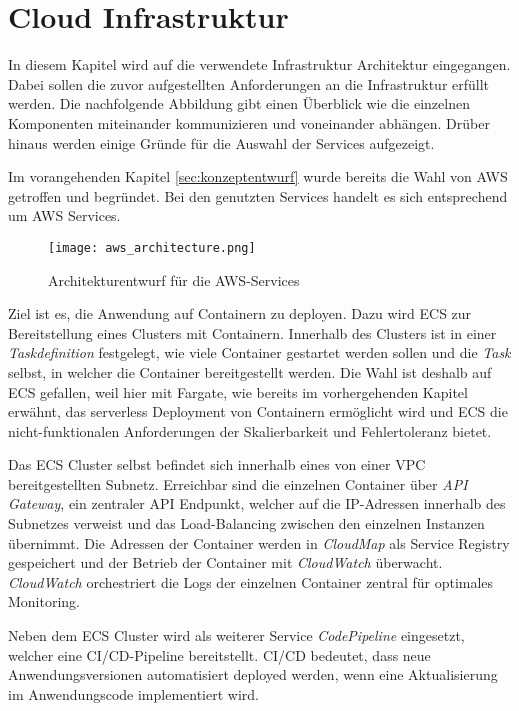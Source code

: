 \section{Cloud Infrastruktur}
In diesem Kapitel wird auf die verwendete Infrastruktur Architektur eingegangen. Dabei sollen die zuvor aufgestellten Anforderungen an die Infrastruktur erfüllt werden. Die nachfolgende Abbildung gibt einen Überblick wie die einzelnen Komponenten miteinander kommunizieren und voneinander abhängen. Drüber hinaus werden einige Gründe für die Auswahl der Services aufgezeigt.

Im vorangehenden Kapitel \ref{sec:konzeptentwurf} wurde bereits die Wahl von \ac{AWS} getroffen und begründet. Bei den genutzten Services handelt es sich entsprechend um \ac{AWS} Services.

\begin{figure}[H]
    \centering
    \texttt{[image: aws\_architecture.png]}
    \caption{Architekturentwurf für die AWS-Services}
    \label{fig:CloudArchitektur}
\end{figure}

Ziel ist es, die Anwendung auf Containern zu deployen. Dazu wird \ac{ECS} zur Bereitstellung eines Clusters mit Containern. Innerhalb des Clusters ist in einer \textit{Taskdefinition} festgelegt, wie viele Container gestartet werden sollen und die \textit{Task} selbst, in welcher die Container bereitgestellt werden. Die Wahl ist deshalb auf \ac{ECS} gefallen, weil hier mit \gls{Fargate}, wie bereits im vorhergehenden Kapitel erwähnt, das serverless Deployment von Containern ermöglicht wird und \ac{ECS} die nicht-funktionalen Anforderungen der Skalierbarkeit und Fehlertoleranz bietet. \pagebreak

Das \ac{ECS} Cluster selbst befindet sich innerhalb eines von einer \ac{VPC} bereitgestellten Subnetz. Erreichbar sind die einzelnen Container über \textit{API Gateway}, ein zentraler API Endpunkt, welcher auf die IP-Adressen innerhalb des Subnetzes verweist und das Load-Balancing zwischen den einzelnen Instanzen übernimmt. Die Adressen der Container werden in \textit{CloudMap} als Service Registry gespeichert und der Betrieb der Container mit \textit{CloudWatch} überwacht. \textit{CloudWatch} orchestriert die Logs der einzelnen Container zentral für optimales Monitoring.

Neben dem \ac{ECS} Cluster wird als weiterer Service \textit{\gls{CodePipeline}} eingesetzt, welcher eine \ac{CI/CD}-Pipeline bereitstellt. \ac{CI/CD} bedeutet, dass neue Anwendungsversionen automatisiert deployed werden, wenn eine Aktualisierung im Anwendungscode implementiert wird. 

